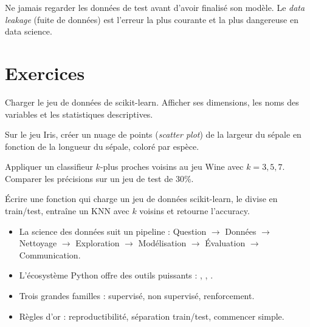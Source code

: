 \begin{attention}
Ne jamais regarder les donn\'ees de test avant d'avoir finalis\'e son mod\`ele. Le \emph{data leakage} (fuite de donn\'ees) est l'erreur la plus courante et la plus dangereuse en data science.
\end{attention}

\section{Exercices}

\begin{exercice}[$\star$]
Charger le jeu de donn\'ees  de scikit-learn. Afficher ses dimensions, les noms des variables et les statistiques descriptives.
\end{exercice}

\begin{exercice}[$\star$]
Sur le jeu Iris, cr\'eer un nuage de points (\emph{scatter plot}) de la largeur du s\'epale en fonction de la longueur du s\'epale, color\'e par esp\`ece.
\end{exercice}

\begin{exercice}[$\star\star$]
Appliquer un classifieur $k$-plus proches voisins au jeu Wine avec $k=3,5,7$. Comparer les pr\'ecisions sur un jeu de test de 30\%.
\end{exercice}

\begin{exercice}[$\star\star$]
\'Ecrire une fonction  qui charge un jeu de donn\'ees scikit-learn, le divise en train/test, entra\^ine un KNN avec $k$ voisins et retourne l'accuracy.
\end{exercice}

\begin{formules}[title=\textbf{R\'esum\'e du chapitre}]
\begin{itemize}
\item La science des donn\'ees suit un pipeline : Question $\to$ Donn\'ees $\to$ Nettoyage $\to$ Exploration $\to$ Mod\'elisation $\to$ \'Evaluation $\to$ Communication.
\item L'\'ecosyst\`eme Python offre des outils puissants : , , .
\item Trois grandes familles : supervis\'e, non supervis\'e, renforcement.
\item R\`egles d'or : reproductibilit\'e, s\'eparation train/test, commencer simple.
\end{itemize}
\end{formules}
